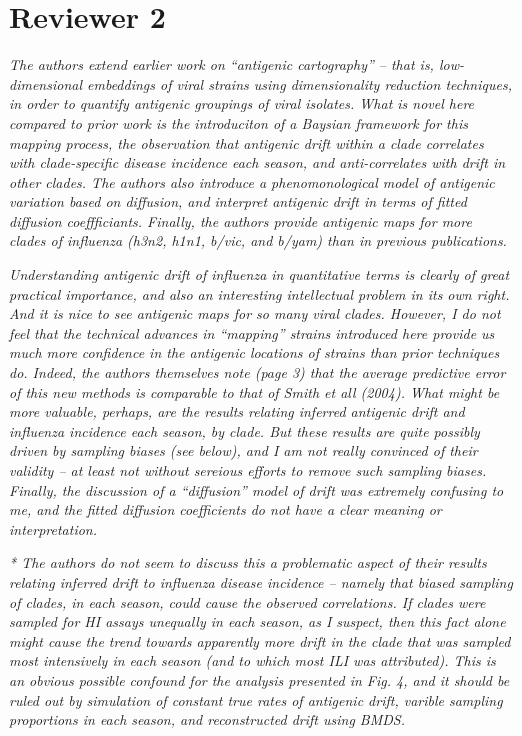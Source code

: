 \documentclass[11pt,oneside,letterpaper]{article}
\begin{document}
\section*{Reviewer 2}

\textsl{The authors extend earlier work on ``antigenic cartography'' -- that is, low-dimensional embeddings of viral strains using dimensionality reduction techniques, in order to quantify antigenic groupings of viral isolates. What is novel here compared to prior work is the introduciton of a Baysian framework for this mapping process, the observation that antigenic drift within a clade correlates with clade-specific disease incidence each season, and anti-correlates with drift in other clades. The authors also introduce a phenomonological model of antigenic variation based on diffusion, and interpret antigenic drift in terms of fitted diffusion coeffficiants. Finally, the authors provide antigenic maps for more clades of influenza (h3n2, h1n1, b/vic, and b/yam) than in previous publications.}

\textsl{Understanding antigenic drift of influenza in quantitative terms is clearly of great practical importance, and also an interesting intellectual problem in its own right. And it is nice to see antigenic maps for so many viral clades. However, I do not feel that the technical advances in ``mapping'' strains introduced here provide us much more confidence in the antigenic locations of strains than prior techniques do. Indeed, the authors themselves note (page 3) that the average predictive error of this new methods is comparable to that of Smith et all (2004). What might be more valuable, perhaps, are the results relating inferred antigenic drift and influenza incidence each season, by clade. But these results are quite possibly driven by sampling biases (see below), and I am not really convinced of their validity -- at least not without sereious efforts to remove such sampling biases. Finally, the discussion of a ``diffusion'' model of drift was extremely confusing to me, and the fitted diffusion coefficients do not have a clear meaning or interpretation.}

\textsl{* The authors do not seem to discuss this a problematic aspect of their results relating inferred drift to influenza disease incidence -- namely that biased sampling of clades, in each season, could cause the observed correlations. If clades were sampled for HI assays unequally in each season, as I suspect, then this fact alone might cause the trend towards apparently more drift in the clade that was sampled most intensively in each season (and to which most ILI was attributed). This is an obvious possible confound for the analysis presented in Fig. 4, and it should be ruled out by simulation of constant true rates of antigenic drift, varible sampling proportions in each season, and reconstructed drift using BMDS.}
\end{document}
